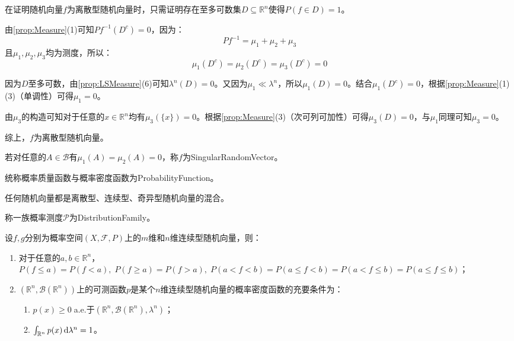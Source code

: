 \begin{note}
	在证明随机向量$f$为离散型随机向量时，只需证明存在至多可数集$D\subseteq\mathbb{R}^{n}$使得$P(f\in D)=1$。\par
	由\cref{prop:Measure}(1)可知$Pf^{-1}(D^c)=0$，因为：
	\begin{equation*}
		Pf^{-1}=\mu_1+\mu_2+\mu_3
	\end{equation*}
	且$\mu_1,\mu_2,\mu_3$均为测度，所以：
	\begin{equation*}
		\mu_1(D^c)=\mu_2(D^c)=\mu_3(D^c)=0
	\end{equation*}\par
	因为$D$至多可数，由\cref{prop:LSMeasure}(6)可知$\lambda^n(D)=0$。又因为$\mu_1\ll\lambda^n$，所以$\mu_1(D)=0$。结合$\mu_1(D^c)=0$，根据\cref{prop:Measure}(1)(3)（单调性）可得$\mu_1=0$。\par
	由$\mu_3$的构造可知对于任意的$x\in\mathbb{R}^{n}$均有$\mu_3(\{x\})=0$。根据\cref{prop:Measure}(3)（次可列可加性）可得$\mu_3(D)=0$，与$\mu_1$同理可知$\mu_3=0$。\par
	综上，$f$为离散型随机向量。
\end{note}
若对任意的$A\in\mathcal{B}$有$\mu_1(A)=\mu_2(A)=0$，称$f$为\gls{SingularRandomVector}。\par
统称概率质量函数与概率密度函数为\gls{ProbabilityFunction}。
\begin{theorem}
	任何随机向量都是离散型、连续型、奇异型随机向量的混合。
\end{theorem}
\begin{definition}
	称一族概率测度$\mathscr{P}$为\gls{DistributionFamily}。
\end{definition}
\begin{property}\label{prop:ContinuousRV}
	设$f,g$分别为概率空间$(X,\mathscr{F},P)$上的$m$维和$n$维连续型随机向量，则：
	\begin{enumerate}
		\item 对于任意的$a,b\in\mathbb{R}^{n}$，$P(f\leqslant a)=P(f<a),\;P(f\geqslant a)=P(f>a),\;P(a<f<b)=P(a\leqslant f<b)=P(a<f\leqslant b)=P(a\leqslant f\leqslant b)$；
		\item $(\mathbb{R}^{n},\mathcal{B}(\mathbb{R}^{n}))$上的可测函数$p$是某个$n$维连续型随机向量的概率密度函数的充要条件为：
		\begin{enumerate}
			\item $p(x)\geqslant0\;$a.e.于$(\mathbb{R}^{n},\mathcal{B}(\mathbb{R}^{n}),\lambda^n)$；
			\item $\int_{\mathbb{R}^{n}}p(x)\mathop{}\!\mathrm{d}\lambda^n=1$。
		\end{enumerate}
	\end{enumerate}
\end{property}
